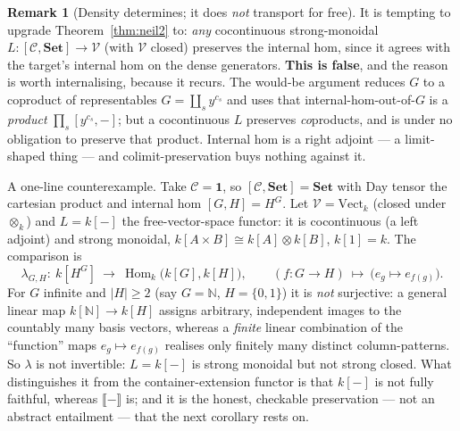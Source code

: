 \documentclass[11pt]{article}
\theoremstyle{plain}
\theoremstyle{definition}
\newtheorem{remark}[theorem]{Remark}
\newcommand{\Set}{\mathbf{Set}}
\DeclareMathOperator{\Hom}{Hom}
\newcommand{\iso}{\cong}
\newcommand{\ext}[1]{\llbracket #1 \rrbracket}
\begin{document}
\begin{remark}[Density determines; it does \emph{not} transport for free]
\label{rem:notfree}
It is tempting to upgrade Theorem~\ref{thm:neil2} to: \emph{any} cocontinuous
strong-monoidal $L\colon[\mathcal C,\Set]\to\mathcal V$ (with $\mathcal V$ closed)
preserves the internal hom, since it agrees with the target's internal hom on the
dense generators. \textbf{This is false}, and the reason is worth internalising,
because it recurs. The would-be argument reduces $G$ to a coproduct of
representables $G=\coprod_{s}y^{c_{s}}$ and uses that internal-hom-out-of-$G$ is a
\emph{product} $\prod_{s}[y^{c_{s}},-]$; but a cocontinuous $L$ preserves
\emph{co}products, and is under no obligation to preserve that product. Internal
hom is a right adjoint --- a limit-shaped thing --- and colimit-preservation buys
nothing against it.

A one-line counterexample. Take $\mathcal C=\mathbf 1$, so
$[\mathcal C,\Set]=\Set$ with Day tensor the cartesian product and internal hom
$[G,H]=H^{G}$. Let $\mathcal V=\mathrm{Vect}_{k}$ (closed under $\otimes_{k}$) and
$L=k[-]$ the free-vector-space functor: it is cocontinuous (a left adjoint) and
strong monoidal, $k[A\times B]\iso k[A]\otimes k[B]$, $k[1]=k$. The comparison is
\[
  \lambda_{G,H}\colon\ k[H^{G}]\ \longrightarrow\ \Hom_{k}\bigl(k[G],k[H]\bigr),
  \qquad (f\colon G\to H)\ \longmapsto\ \bigl(e_{g}\mapsto e_{f(g)}\bigr).
\]
For $G$ infinite and $|H|\ge2$ (say $G=\mathbb N$, $H=\{0,1\}$) it is \emph{not}
surjective: a general linear map $k[\mathbb N]\to k[H]$ assigns arbitrary,
independent images to the countably many basis vectors, whereas a
\emph{finite} linear combination of the ``function'' maps $e_{g}\mapsto e_{f(g)}$
realises only finitely many distinct column-patterns. So $\lambda$ is not
invertible: $L=k[-]$ is strong monoidal but not strong closed. What distinguishes
it from the container-extension functor is that $k[-]$ is not fully faithful,
whereas $\ext{-}$ is; and it is the honest, checkable preservation --- not an
abstract entailment --- that the next corollary rests on.
\end{remark}
\end{document}

